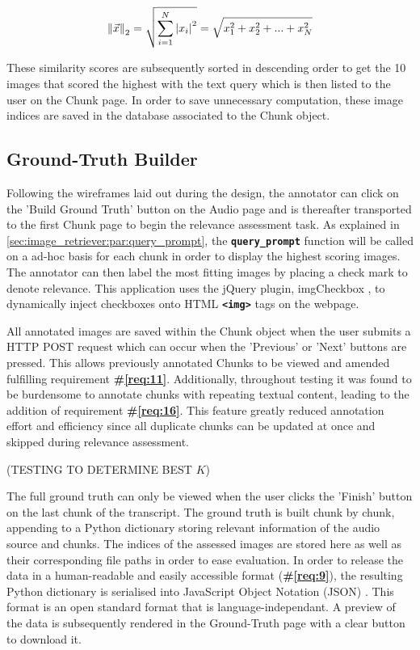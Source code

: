 \documentclass{l4proj}
\begin{document}
\begin{equation}
    \norm{\vec{x}}_2 = \sqrt{\sum_{i=1}^N \abs{x_i}^2} = \sqrt{x_1^2 + x_2^2 + ... + x_N^2}
    \label{eq:euclidean_norm}
\end{equation}    

These similarity scores are subsequently sorted in descending order to get the 10 images that scored the highest with the text query which is then listed to the user on the Chunk page. In order to save unnecessary computation, these image indices are saved in the database associated to the Chunk object.


\subsection{Ground-Truth Builder}
Following the wireframes laid out during the design, the annotator can click on the 'Build Ground Truth' button on the Audio page and is thereafter transported to the first Chunk page to begin the relevance assessment task. As explained in \ref{sec:image_retriever:par:query_prompt}, the \textbf{\lstinline|query_prompt|} function will be called on a ad-hoc basis for each chunk in order to display the highest scoring images. The annotator can then label the most fitting images by placing a check mark to denote relevance. This application uses the jQuery plugin, imgCheckbox \citep{imgcheckbox}, to dynamically inject checkboxes onto HTML \textbf{\lstinline|<img>|} tags on the webpage. 

All annotated images are saved within the Chunk object when the user submits a HTTP POST request which can occur when the 'Previous' or 'Next' buttons are pressed. This allows previously annotated Chunks to be viewed and amended fulfilling requirement \textbf{\#\ref{req:11}}. Additionally, throughout testing it was found to be burdensome to annotate chunks with repeating textual content, leading to the addition of requirement \textbf{\#\ref{req:16}}. This feature greatly reduced annotation effort and efficiency since all duplicate chunks can be updated at once and skipped during relevance assessment.

(TESTING TO DETERMINE BEST $K$)

The full ground truth can only be viewed when the user clicks the 'Finish' button on the last chunk of the transcript. The ground truth is built chunk by chunk, appending to a Python dictionary storing relevant information of the audio source and chunks. The indices of the assessed images are stored here as well as their corresponding file paths in order to ease evaluation. In order to release the data in a human-readable and easily accessible format (\textbf{\#\ref{req:9}}), the resulting Python dictionary is serialised into JavaScript Object Notation (JSON) \citep{json}. This format is an open standard format that is language-independant. A preview of the data is subsequently rendered in the Ground-Truth page with a clear button to download it.
\end{document}
